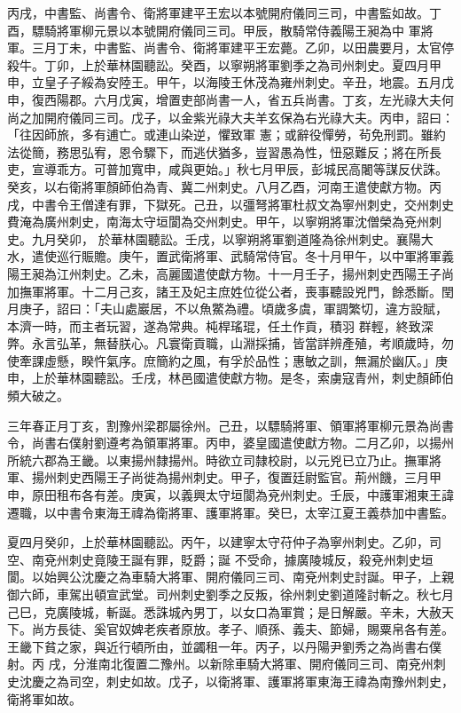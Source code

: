 \begin{pinyinscope}
 丙戌，中書監、尚書令、衛將軍建平王宏以本號開府儀同三司，中書監如故。丁酉，驃騎將軍柳元景以本號開府儀同三司。甲辰，散騎常侍義陽王昶為中
 軍將軍。三月丁未，中書監、尚書令、衛將軍建平王宏薨。乙卯，以田農要月，太官停殺牛。丁卯，上於華林園聽訟。癸酉，以寧朔將軍劉季之為司州刺史。夏四月甲申，立皇子子綏為安陸王。甲午，以海陵王休茂為雍州刺史。辛丑，地震。五月戊申，復西陽郡。六月戊寅，增置吏部尚書一人，省五兵尚書。丁亥，左光祿大夫何尚之加開府儀同三司。戊子，以金紫光祿大夫羊玄保為右光祿大夫。丙申，詔曰：「往因師旅，多有逋亡。或連山染逆，懼致軍
 憲；或辭役憚勞，茍免刑罰。雖約法從簡，務思弘宥，恩令驟下，而逃伏猶多，豈習愚為性，忸惡難反；將在所長吏，宣導乖方。可普加寬申，咸與更始。」秋七月甲辰，彭城民高闍等謀反伏誅。癸亥，以右衛將軍顏師伯為青、冀二州刺史。八月乙酉，河南王遣使獻方物。丙戌，中書令王僧達有罪，下獄死。己丑，以彊弩將軍杜叔文為寧州刺史，交州刺史費淹為廣州刺史，南海太守垣閬為交州刺史。甲午，以寧朔將軍沈僧榮為兗州刺史。九月癸卯，
 於華林園聽訟。壬戌，以寧朔將軍劉道隆為徐州刺史。襄陽大水，遣使巡行賑贍。庚午，置武衛將軍、武騎常侍官。冬十月甲午，以中軍將軍義陽王昶為江州刺史。乙未，高麗國遣使獻方物。十一月壬子，揚州刺史西陽王子尚加撫軍將軍。十二月己亥，諸王及妃主庶姓位從公者，喪事聽設兇門，餘悉斷。閏月庚子，詔曰：「夫山處巖居，不以魚鱉為禮。頃歲多虞，軍調繁切，違方設賦，本濟一時，而主者玩習，遂為常典。杶桿瑤琨，任土作貢，積羽
 群輕，終致深弊。永言弘革，無替朕心。凡寰衛貢職，山淵採捕，皆當詳辨產殖，考順歲時，勿使牽課虛懸，睽忤氣序。庶簡約之風，有孚於品性；惠敏之訓，無漏於幽仄。」庚申，上於華林園聽訟。壬戌，林邑國遣使獻方物。是冬，索虜寇青州，刺史顏師伯頻大破之。



 三年春正月丁亥，割豫州梁郡屬徐州。己丑，以驃騎將軍、領軍將軍柳元景為尚書令，尚書右僕射劉遵考為領軍將軍。丙申，婆皇國遣使獻方物。二月乙卯，以揚州
 所統六郡為王畿。以東揚州隸揚州。時欲立司隸校尉，以元兇已立乃止。撫軍將軍、揚州刺史西陽王子尚徙為揚州刺史。甲子，復置廷尉監官。荊州饑，三月甲申，原田租布各有差。庚寅，以義興太守垣閬為兗州刺史。壬辰，中護軍湘東王諱遷職，以中書令東海王禕為衛將軍、護軍將軍。癸巳，太宰江夏王義恭加中書監。



 夏四月癸卯，上於華林園聽訟。丙午，以建寧太守苻仲子為寧州刺史。乙卯，司空、南兗州刺史竟陵王誕有罪，貶爵；誕
 不受命，據廣陵城反，殺兗州刺史垣閬。以始興公沈慶之為車騎大將軍、開府儀同三司、南兗州刺史討誕。甲子，上親御六師，車駕出頓宣武堂。司州刺史劉季之反叛，徐州刺史劉道隆討斬之。秋七月己巳，克廣陵城，斬誕。悉誅城內男丁，以女口為軍賞；是日解嚴。辛未，大赦天下。尚方長徒、奚官奴婢老疾者原放。孝子、順孫、義夫、節婦，賜粟帛各有差。王畿下貧之家，與近行頓所由，並蠲租一年。丙子，以丹陽尹劉秀之為尚書右僕射。丙
 戌，分淮南北復置二豫州。以新除車騎大將軍、開府儀同三司、南兗州刺史沈慶之為司空，刺史如故。戊子，以衛將軍、護軍將軍東海王禕為南豫州刺史，衛將軍如故。




\end{pinyinscope}
